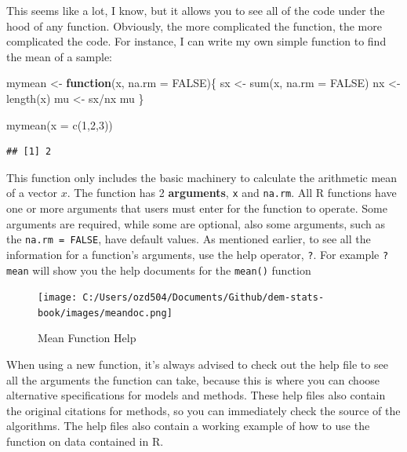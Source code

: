 \documentclass[
]{article}
\newenvironment{Shaded}{\begin{snugshade}}{\end{snugshade}}
\newcommand{\AttributeTok}[1]{\textcolor[rgb]{0.77,0.63,0.00}{#1}}
\newcommand{\ConstantTok}[1]{\textcolor[rgb]{0.00,0.00,0.00}{#1}}
\newcommand{\ControlFlowTok}[1]{\textcolor[rgb]{0.13,0.29,0.53}{\textbf{#1}}}
\newcommand{\DecValTok}[1]{\textcolor[rgb]{0.00,0.00,0.81}{#1}}
\newcommand{\FunctionTok}[1]{\textcolor[rgb]{0.00,0.00,0.00}{#1}}
\newcommand{\NormalTok}[1]{#1}
\newcommand{\OtherTok}[1]{\textcolor[rgb]{0.56,0.35,0.01}{#1}}
\newcommand{\SpecialCharTok}[1]{\textcolor[rgb]{0.00,0.00,0.00}{#1}}
\begin{document}
This seems like a lot, I know, but it allows you to see all of the code
under the hood of any function. Obviously, the more complicated the
function, the more complicated the code. For instance, I can write my
own simple function to find the mean of a sample:

\begin{Shaded}
\begin{Highlighting}[]
\NormalTok{mymean }\OtherTok{\textless{}{-}} \ControlFlowTok{function}\NormalTok{(x,}
                   \AttributeTok{na.rm =} \ConstantTok{FALSE}\NormalTok{)\{}
\NormalTok{  sx }\OtherTok{\textless{}{-}} \FunctionTok{sum}\NormalTok{(x, }
            \AttributeTok{na.rm =} \ConstantTok{FALSE}\NormalTok{)}
\NormalTok{  nx }\OtherTok{\textless{}{-}} \FunctionTok{length}\NormalTok{(x)}
\NormalTok{  mu }\OtherTok{\textless{}{-}}\NormalTok{ sx}\SpecialCharTok{/}\NormalTok{nx}
\NormalTok{  mu}
\NormalTok{\}}

\FunctionTok{mymean}\NormalTok{(}\AttributeTok{x =} \FunctionTok{c}\NormalTok{(}\DecValTok{1}\NormalTok{,}\DecValTok{2}\NormalTok{,}\DecValTok{3}\NormalTok{))}
\end{Highlighting}
\end{Shaded}

\begin{verbatim}
## [1] 2
\end{verbatim}

This function only includes the basic machinery to calculate the
arithmetic mean of a vector \(x\). The function has 2 \textbf{arguments}, \texttt{x}
and \texttt{na.rm}. All R functions have one or more arguments that users must
enter for the function to operate. Some arguments are required, while
some are optional, also some arguments, such as the \texttt{na.rm\ =\ FALSE},
have default values. As mentioned earlier, to see all the information
for a function's arguments, use the help operator, \texttt{?}. For example
\texttt{?mean} will show you the help documents for the \texttt{mean()} function

\begin{figure}
\centering
\texttt{[image: C:/Users/ozd504/Documents/Github/dem-stats-book/images/meandoc.png]}
\caption{Mean Function
Help}
\end{figure}

When using a new function, it's always advised to check out the help
file to see all the arguments the function can take, because this is
where you can choose alternative specifications for models and methods.
These help files also contain the original citations for methods, so you
can immediately check the source of the algorithms. The help files also
contain a working example of how to use the function on data contained
in R.
\end{document}
